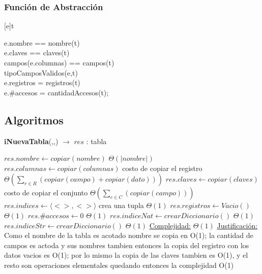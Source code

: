 \subsubsection{Funci\'on de Abstracci\'on}


[e]{t}{e.nombre == nombre(t) \yluego \\
						e.claves == claves(t) \yluego \\
						campos(e.columnas) == campos(t) \yluego \\
						tipoCamposValidos(e,t) \yluego \\
						e.registros = registros(t)  \yluego \\
						e.\#accesos = cantidadAccesos(t);

}					


\subsection{Algoritmos}


\lstset{style=alg}


\begin{algorithm}[H]{\textbf{iNuevaTabla}(,,) $\to$ $res$ : tabla}
	\begin{algorithmic}[1]
		\State $res.nombre \gets copiar(nombre)$ \Comment $\Theta(|nombre|)$
		\State $res.columnas \gets copiar(columnas)$ \Comment costo de copiar el registro $\Theta(\sum_{r \in R}{(copiar(campo)+copiar(dato))})$
		\State $res.claves \gets copiar(claves)$ \Comment costo de copiar el conjunto $\Theta(\sum_{c \in C}{(copiar(campo))})$
		\State $res.indices \gets \langle<>,<>\rangle$ crea una tupla \Comment $\Theta(1)$
		\State $res.registros \gets Vacio()$ \Comment $\Theta(1)$
		\State $res.\#accesos \gets 0$ \Comment $\Theta(1)$
		\State $res.indiceNat \gets crearDiccionario()$ \Comment $\Theta(1)$
		\State $res.indiceStr \gets crearDiccionario()$ \Comment $\Theta(1)$
		\medskip
		\Statex \underline{Complejidad:} $\Theta(1)$
		\Statex \underline{Justificación:} Como el nombre de la tabla es acotado nombre se copia en O(1); la cantidad de campos es actoda y sus nombres tambien entonces la copia del registro con los datos vacios es O(1); por lo mismo la copia de las claves tambien es O(1), y el resto son operaciones elementales quedando entonces la complejidad O(1)  
    \end{algorithmic}
\end{algorithm}

